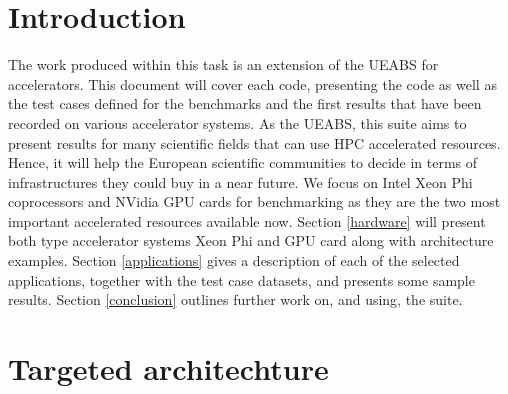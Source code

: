 \part{Introduction}
The work produced within this task is an extension of the UEABS for accelerators. This document will cover each code, presenting the code as well as the test cases defined for the benchmarks and the first results that have been recorded on various accelerator systems.
As the UEABS, this suite aims to present results for many scientific fields that can use HPC accelerated resources. Hence, it will help the European scientific communities to decide in terms of infrastructures they could buy in a near future. We focus on Intel Xeon Phi coprocessors and NVidia GPU cards for benchmarking as they are the two most important accelerated resources available now.
Section \ref{hardware} will present both type accelerator systems Xeon Phi and GPU card along with architecture examples. Section \ref{applications} gives a description of each of the selected applications, together with the test case datasets, and presents some sample results. Section \ref{conclusion} outlines further work on, and using, the suite.


\part{Targeted architechture}




